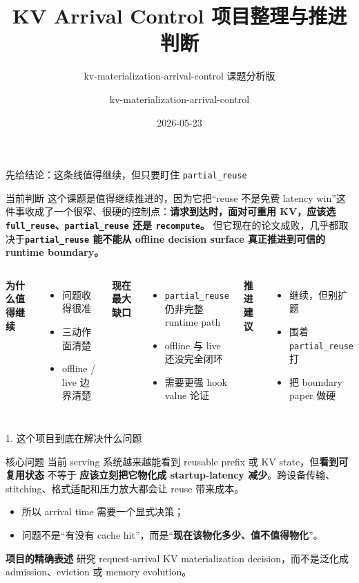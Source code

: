 \documentclass[10pt,aspectratio=169]{ctexbeamer}
\title{KV Arrival Control 项目整理与推进判断}
\subtitle{kv-materialization-arrival-control 课题分析版}
\author{kv-materialization-arrival-control}
\date{2026-05-23}
\begin{document}
\begin{frame}
  \titlepage
\end{frame}

\begin{frame}{先给结论：这条线值得继续，但只要盯住 \texttt{partial\_reuse}}
\begin{block}{当前判断}
这个课题是值得继续推进的，因为它把“reuse 不是免费 latency win”这件事收成了一个很窄、很硬的控制点：\textbf{请求到达时，面对可重用 KV，应该选 \texttt{full\_reuse}、\texttt{partial\_reuse} 还是 \texttt{recompute}。} 但它现在的论文成败，几乎都取决于\textbf{\texttt{partial\_reuse} 能不能从 offline decision surface 真正推进到可信的 runtime boundary。}
\end{block}

\begin{columns}[T]
\textbf{为什么值得继续}
\begin{itemize}
  \item 问题收得很准
  \item 三动作面清楚
  \item offline / live 边界清楚
\end{itemize}

\textbf{现在最大缺口}
\begin{itemize}
  \item \texttt{partial\_reuse} 仍非完整 runtime path
  \item offline 与 live 还没完全闭环
  \item 需要更强 hook value 论证
\end{itemize}

\textbf{推进建议}
\begin{itemize}
  \item 继续，但别扩题
  \item 围着 \texttt{partial\_reuse} 打
  \item 把 boundary paper 做硬
\end{itemize}
\end{columns}
\end{frame}

\begin{frame}{1. 这个项目到底在解决什么问题}
\begin{block}{核心问题}
当前 serving 系统越来越能看到 reusable prefix 或 KV state，但\textbf{看到可复用状态} 不等于 \textbf{应该立刻把它物化成 startup-latency 减少}。跨设备传输、stitching、格式适配和压力放大都会让 reuse 带来成本。
\end{block}

\begin{itemize}
  \item 所以 arrival time 需要一个显式决策；
  \item 问题不是“有没有 cache hit”，而是“\textbf{现在该物化多少、值不值得物化}”。
\end{itemize}

\vspace{0.4em}
\textbf{项目的精确表述}
研究 request-arrival KV materialization decision，而不是泛化成 admission、eviction 或 memory evolution。
\end{frame}
\end{document}
